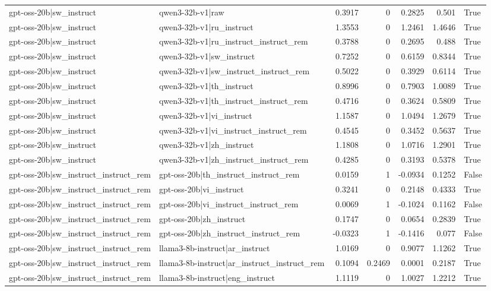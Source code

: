 \begin{table}
\begin{tabular}{l l r r r r l}
gpt-oss-20b|sw_instruct & qwen3-32b-v1|raw & 0.3917 & 0 & 0.2825 & 0.501 & True \\
gpt-oss-20b|sw_instruct & qwen3-32b-v1|ru_instruct & 1.3553 & 0 & 1.2461 & 1.4646 & True \\
gpt-oss-20b|sw_instruct & qwen3-32b-v1|ru_instruct_instruct_rem & 0.3788 & 0 & 0.2695 & 0.488 & True \\
gpt-oss-20b|sw_instruct & qwen3-32b-v1|sw_instruct & 0.7252 & 0 & 0.6159 & 0.8344 & True \\
gpt-oss-20b|sw_instruct & qwen3-32b-v1|sw_instruct_instruct_rem & 0.5022 & 0 & 0.3929 & 0.6114 & True \\
gpt-oss-20b|sw_instruct & qwen3-32b-v1|th_instruct & 0.8996 & 0 & 0.7903 & 1.0089 & True \\
gpt-oss-20b|sw_instruct & qwen3-32b-v1|th_instruct_instruct_rem & 0.4716 & 0 & 0.3624 & 0.5809 & True \\
gpt-oss-20b|sw_instruct & qwen3-32b-v1|vi_instruct & 1.1587 & 0 & 1.0494 & 1.2679 & True \\
gpt-oss-20b|sw_instruct & qwen3-32b-v1|vi_instruct_instruct_rem & 0.4545 & 0 & 0.3452 & 0.5637 & True \\
gpt-oss-20b|sw_instruct & qwen3-32b-v1|zh_instruct & 1.1808 & 0 & 1.0716 & 1.2901 & True \\
gpt-oss-20b|sw_instruct & qwen3-32b-v1|zh_instruct_instruct_rem & 0.4285 & 0 & 0.3193 & 0.5378 & True \\
gpt-oss-20b|sw_instruct_instruct_rem & gpt-oss-20b|th_instruct_instruct_rem & 0.0159 & 1 & -0.0934 & 0.1252 & False \\
gpt-oss-20b|sw_instruct_instruct_rem & gpt-oss-20b|vi_instruct & 0.3241 & 0 & 0.2148 & 0.4333 & True \\
gpt-oss-20b|sw_instruct_instruct_rem & gpt-oss-20b|vi_instruct_instruct_rem & 0.0069 & 1 & -0.1024 & 0.1162 & False \\
gpt-oss-20b|sw_instruct_instruct_rem & gpt-oss-20b|zh_instruct & 0.1747 & 0 & 0.0654 & 0.2839 & True \\
gpt-oss-20b|sw_instruct_instruct_rem & gpt-oss-20b|zh_instruct_instruct_rem & -0.0323 & 1 & -0.1416 & 0.077 & False \\
gpt-oss-20b|sw_instruct_instruct_rem & llama3-8b-instruct|ar_instruct & 1.0169 & 0 & 0.9077 & 1.1262 & True \\
gpt-oss-20b|sw_instruct_instruct_rem & llama3-8b-instruct|ar_instruct_instruct_rem & 0.1094 & 0.2469 & 0.0001 & 0.2187 & True \\
gpt-oss-20b|sw_instruct_instruct_rem & llama3-8b-instruct|eng_instruct & 1.1119 & 0 & 1.0027 & 1.2212 & True \\

\end{tabular}
\end{table}
